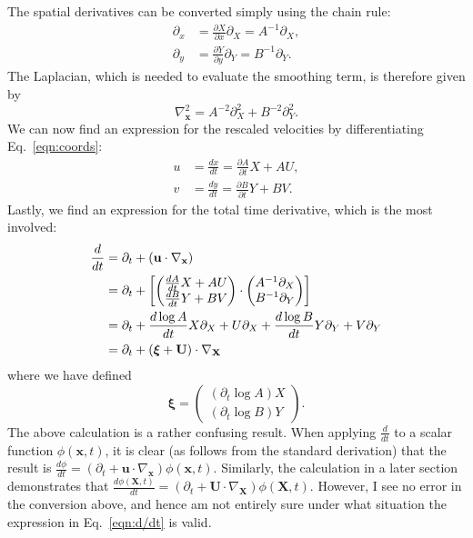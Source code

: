 \documentclass[11pt]{article}
\newcommand{\p}{\partial}
\newcommand{\bxi}{\boldsymbol\xi}
\newcommand{\bU}{\mathbf{U}}
\newcommand{\bX}{\mathbf{X}}
\newcommand{\bx}{\mathbf{x}}
\newcommand{\bu}{\mathbf{u}}
\begin{document}
The spatial derivatives can be converted simply using the chain rule:
\begin{align}
    \p_x &= \frac{\p X}{\p x}\p_X = A^{-1}\p_X, \\
    \p_y &= \frac{\p Y}{\p y}\p_Y =  B^{-1}\p_Y.
    \label{eqn:partials}
\end{align}
The Laplacian, which is needed to evaluate the smoothing term, is therefore given by
\begin{equation}
    \nabla_\bx^2 = A^{-2}\p_X^2 + B^{-2}\p_Y^2.
    \label{eqn:laplacian}
\end{equation}
We can now find an expression for the rescaled velocities by differentiating Eq.~\ref{eqn:coords}:
\begin{align}
    u &= \frac{dx}{dt} = \frac{\p A}{\p t} X + AU, \label{eqn:velu}\\
    v &= \frac{dy}{dt} = \frac{\p B}{\p t} Y + BV. \label{eqn:velv}
\end{align}
Lastly, we find an expression for the total time derivative, which is the most involved:
\begin{align}
    \frac{d}{dt} &= \p_t + (\bu\cdot\nabla_\bx)\\
&= \p_t + \left[ \begin{pmatrix}\strut\frac{dA}{dt}X + AU\\ \frac{dB}{dt}Y + BV\end{pmatrix}\cdot \begin{pmatrix}A^{-1}\p_X\\B^{-1}\p_Y\end{pmatrix}\right]\\
    &= \p_t + \frac{d \log A}{dt}X\p_X + U\p_X + \frac{d\log B}{dt}Y\p_Y + V\p_Y\\
&= \p_t + (\bxi + \bU) \cdot \nabla_\bX
    \label{eqn:d/dt}
\end{align}
where we have defined
\begin{equation}
    \bxi = \begin{pmatrix} (\p_t \log A)X \\ (\p_t \log B) Y\end{pmatrix}.
    \label{eqn:xi}
\end{equation}
The above calculation is a rather confusing result. When applying $\frac{d}{dt}$ to a scalar function $\phi(\bx, t)$, it is clear (as follows from the standard derivation) that the result is $\frac{d\phi}{dt} = (\p_t + \bu\cdot\nabla_\bx)\phi(\bx, t)$. Similarly, the calculation in a later section demonstrates that $\frac{d\phi(\bX, t)}{dt} = (\p_t + \bU\cdot\nabla_\bX)\phi(\bX, t)$. However, I see no error in the conversion above, and hence am not entirely sure under what situation the expression in Eq.~\ref{eqn:d/dt} is valid.
\end{document}
